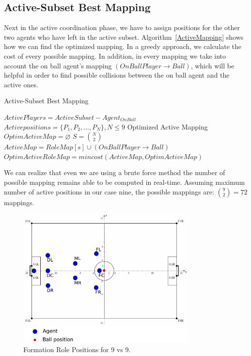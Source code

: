 \subsection{Active-Subset Best Mapping}
Next in the active coordination phase, we have to assign positions for the other two agents who have left in the active subset. Algorithm~\ref{ActiveMapping} shows how we can find the optimized mapping. In a greedy approach, we calculate the cost of every possible mapping. In addition, in every mapping we take into account the on ball agent's mapping $(OnBallPlayer \rightarrow Ball)$, which will be helpful in order to find possible collisions between the on ball agent and the active ones.
\begin{algorithm}[ht!]
\caption{Active-Subset Best Mapping}
\label{ActiveMapping}
\begin{algorithmic}[1]
$ActivePlayers = ActiveSubset - Agent_{OnBall} $
$Activepositions = \lbrace P_{1},P_{2},...,P_{N} \rbrace, N\leq 9 $
Optimized Active Mapping
\STATE $OptimActiveMap = \varnothing $
\STATE $S = {{N}\choose{2}}$
\STATE $ActiveMap = RoleMap[s] \cup (OnBallPlayer \rightarrow Ball)$
\STATE $OptimActiveRoleMap = mincost(ActiveMap,OptimActiveMap)$
\ENDFOR
\end{algorithmic}
\end{algorithm}
We can realize that even we are using a brute force method the number of possible mapping remains able to be computed in real-time. Assuming maximum number of active positions in our case nine, the possible mappings are: ${{9}\choose{2}} = 72$ mappings.


\begin{figure}[t!]
\centering
  \includegraphics[width=0.8\textwidth]{Chapter4/figures/Formation9_0.pdf}
  \caption{Formation Role Positions for 9 vs 9.} 
  \label{fig:Formation9_0}
\end{figure}



